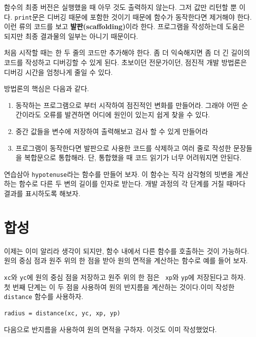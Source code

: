 \documentclass[10pt]{book}
\begin{document}
함수의 최종 버전은 실행했을 때 아무 것도 출력하지 않는다.  그저 값만
리턴할 뿐 이다.  {\tt print}문은 디버깅 때문에 포함한 것이기 때문에
함수가 동작한다면 제거해야 한다.  이런 류의 코드를 보고 {\bf
  발판(scaffolding)}이라 한다.  프로그램을 작성하는데 도움은 되지만
최종 결과물의 일부는 아니기 때문이다.

처음 시작할 때는 한 두 줄의 코드만 추가해야 한다.  좀 더 익숙해지면 좀
더 긴 길이의 코드를 작성하고 디버깅할 수 있게 된다.  초보이던
전문가이던, 점진적 개발 방법론은 디버깅 시간을 엄청나게 줄일 수 있다.

방법론의 핵심은 다음과 같다. 

\begin{enumerate}

\item 동작하는 프로그램으로 부터 시작하여 점진적인 변화를 만들어라.  그래야 어떤 순간이라도 오류를 발견하면 어디에 원인이 있는지 쉽게 찾을 수 있다. 

\item 중간 값들을 변수에 저장하여 출력해보고 검사 할 수 있게 만들어라

\item 프로그램이 동작한다면 발판으로 사용한 코드를 삭제하고 여러 줄로 작성한 문장들을 복합문으로 통합해라.  단, 통합했을 때 코드 읽기가 너무 어려워지면 안된다. 

\end{enumerate}

연습삼아 {\tt hypotenuse}라는 함수를 만들어 보자.  이 함수는 직각
삼각형의 빗변을 계산하는 함수로 다른 두 변의 길이를 인자로 받는다.
개발 과정의 각 단계를 거칠 때마다 결과를 표시하도록 해보자.



\section{합성}

이제는 이미 알리라 생각이 되지만, 함수 내에서 다른 함수를 호출하는 것이
가능하다.  원의 중심 점과 원주 위의 한 점을 받아 원의 면적을 계산하는
함수로 예를 들어 보자.

{\tt xc}와 {\tt yc}에 원의 중심 점을 저장하고 원주 위의 한 점은 {\tt
  xp}와 {\tt yp}에 저장된다고 하자.  첫 번째 단계는 이 두 점을 사용하여
원의 반지름을 계산하는 것이다.이미 작성한 {\tt distance} 함수를
사용하자.


\begin{verbatim}
radius = distance(xc, yc, xp, yp)
\end{verbatim}
%
다음으로 반지름을 사용하여 원의 면적을 구하자.  이것도 이미 작성했었다.
\end{document}
